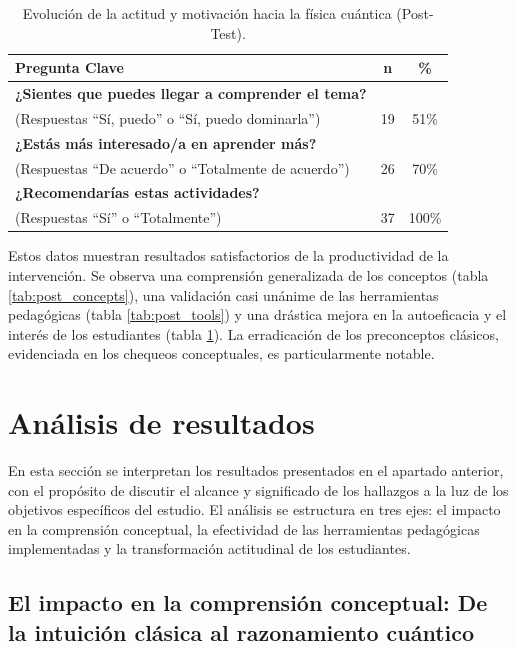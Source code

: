 \documentclass[10pt,a4paper]{article}
\begin{document}
\begin{table}[h!]
\centering
\caption{Evolución de la actitud y motivación hacia la física cuántica (Post-Test).}
\label{tab:post_attitude}
\begin{tabular}{|l|c|c|}
\hline
\textbf{Pregunta Clave} & \textbf{n} & \textbf{\%} \\
\hline
\textbf{¿Sientes que puedes llegar a comprender el tema?} & & \\
(Respuestas ``Sí, puedo'' o ``Sí, puedo dominarla'') & 19 & 51\% \\
\hline
\textbf{¿Estás más interesado/a en aprender más?} & & \\
(Respuestas ``De acuerdo'' o ``Totalmente de acuerdo'') & 26 & 70\% \\
\hline
\textbf{¿Recomendarías estas actividades?} & & \\
(Respuestas ``Sí'' o ``Totalmente'') & 37 & 100\% \\
\hline
\end{tabular}
\end{table}

Estos datos muestran resultados satisfactorios de la productividad de la intervención. Se observa una comprensión generalizada de los conceptos (tabla \ref{tab:post_concepts}), una validación casi unánime de las herramientas pedagógicas (tabla \ref{tab:post_tools}) y una drástica mejora en la autoeficacia y el interés de los estudiantes (tabla \ref{tab:post_attitude}). La erradicación de los preconceptos clásicos, evidenciada en los chequeos conceptuales, es particularmente notable.



\section{Análisis de resultados}

En esta sección se interpretan los resultados presentados en el apartado anterior, con el propósito de discutir el alcance y significado de los hallazgos a la luz de los objetivos específicos del estudio. El análisis se estructura en tres ejes: el impacto en la comprensión conceptual, la efectividad de las herramientas pedagógicas implementadas y la transformación actitudinal de los estudiantes.

\subsection{El impacto en la comprensión conceptual: De la intuición clásica al razonamiento cuántico}
\end{document}
